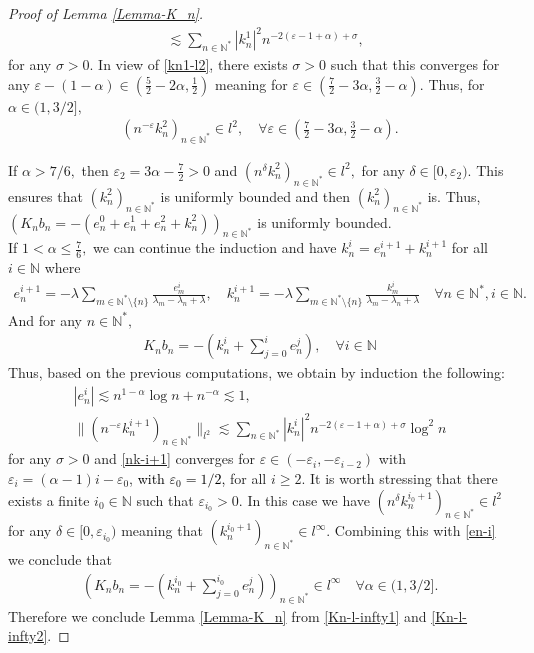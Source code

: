 \documentclass[10pt,a4paper]{amsart}
\begin{document}
\begin{proof}[Proof of Lemma \ref{Lemma-K_n}]
\begin{align*}
    &\lesssim \sum_{n\in \mathbb{N}^*}|k_n^1|^2n^{-2(\varepsilon-1+\alpha)+\sigma},
\end{align*}
for any $\sigma>0$.
In view of \eqref{kn1-l2}, there exists $\sigma>0$ such that this converges for any $\varepsilon -(1-\alpha)\in \left(\frac{5}{2}-2\alpha,\frac{1}{2}\right)$ meaning for $\varepsilon\in \left(\frac{7}{2}-3\alpha,\frac{3}{2}-\alpha\right).$ Thus, for $\alpha\in (1,3/2],$
\begin{align*}
    (n^{-\varepsilon}k_n^2)_{n\in \mathbb{N}^*}\in l^2, \quad \forall \varepsilon\in \left(\frac{7}{2}-3\alpha,\frac{3}{2}-\alpha\right).
\end{align*}

If $\alpha > 7/6,$ then $\varepsilon_2=3\alpha-\frac{7}{2}>0$ and $(n^{\delta}k_n^2)_{n\in \mathbb{N}^*}\in l^2,$ for any $\delta\in [0,\varepsilon_2).$ This ensures that $(k_n^2)_{n\in \mathbb{N}^*}$ is uniformly bounded and then $(k_n^2)_{n\in \mathbb{N}^*}$ is. Thus, $\left(K_n b_n=-(e_n^0+e^1_n+e_n^2+k_n^2)\right)_{n\in \mathbb{N}^*}$ is uniformly bounded.\\

If $1<\alpha\leq \frac{7}{6},$ we can continue the induction and have
$k_n^i=e_n^{i+1}+k_n^{i+1}$ for all $i\in \mathbb{N}$ where
\begin{align*}
  e_n^{i+1}=  -\lambda\sum_{m\in \mathbb{N}^*\setminus\{n\}}\frac{e_m^i}{\lambda_m-\lambda_n+\lambda}, \quad k_n^{i+1}=-\lambda\sum_{m\in \mathbb{N}^*\setminus\{n\}}\frac{k_m^i}{\lambda_m-\lambda_n+\lambda} \quad \forall n\in \mathbb{N}^*, i\in \mathbb{N}.
\end{align*}
And for any $n\in \mathbb{N}^*,$
\begin{align*}
    K_n b_n=-\left(k_n^i+\sum_{j=0}^{i}e_n^j\right), \quad \forall i\in \mathbb{N}
\end{align*}
Thus, based on the previous computations, we obtain by induction the following:
\begin{align}
    |e_n^i|\lesssim n^{1-\alpha}\log n+n^{-\alpha}\lesssim 1,\label{en-i}\\
    \|(n^{-\varepsilon}k_n^{i+1})_{n\in \mathbb{N}^*}\|_{l^2}\lesssim \sum_{n\in \mathbb{N}^*}|k_n^i|^2n^{-2(\varepsilon-1+\alpha)+\sigma}\log^2 n\label{nk-i+1}
\end{align} for any $\sigma>0$ and \eqref{nk-i+1} converges for $\varepsilon\in (-\varepsilon_i,-\varepsilon_{i-2})$ with $\varepsilon_i=(\alpha-1)i-\varepsilon_0$, \textcolor{black}{with $\varepsilon_{0}=1/2$,} for all $i\geq 2.$ It is worth stressing that there exists a finite $i_0\in \mathbb{N}$ such that $\varepsilon_{i_0}>0.$ In this case we have $(n^{\delta}k_n^{i_0+1})_{n\in \mathbb{N}^*}\in l^2$ for any $\delta \in [0,\varepsilon_{i_0})$ meaning that $(k_n^{i_0+1})_{n\in \mathbb{N}^*}\in l^{\infty}.$ Combining this with \eqref{en-i} we conclude that 
\begin{align}
    \left(K_n b_n=-\left(k_n^{i_0}+\sum_{j=0}^{i_0}e_n^j\right)\right)_{n\in \mathbb{N}^*}\in l^{\infty}\quad \forall \alpha\in (1, 3/2]. \label{Kn-l-infty2}
\end{align}
Therefore we conclude Lemma \ref{Lemma-K_n} from \eqref{Kn-l-infty1} and \eqref{Kn-l-infty2}.
\end{proof}
\end{document}
